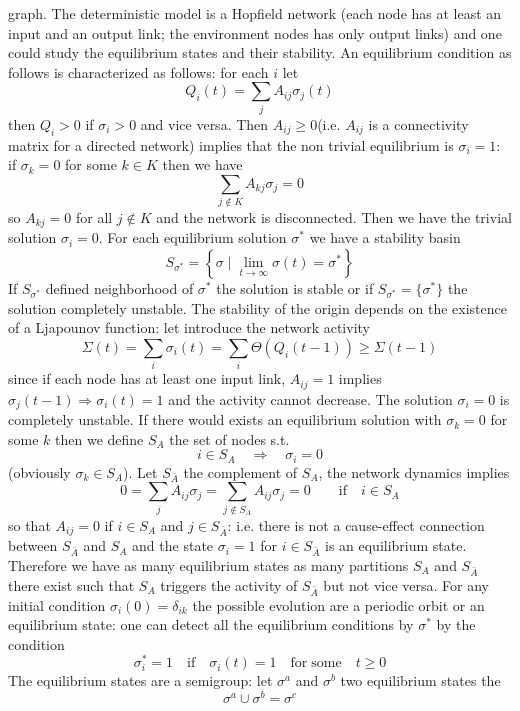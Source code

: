 graph. The deterministic model is a Hopfield network (each node has at least an input and an output link; the environment nodes has only output links)
and one could study the equilibrium states and their stability. An equilibrium condition as follows is characterized as follows:
for each $i$ let
$$
Q_i(t)=\sum_j A_{ij}\sigma_j(t) 
$$
then $Q_i>0$ if $\sigma_i>0$ and vice versa.  Then $A_{ij}\ge 0$(i.e. $A_{ij}$ is a connectivity matrix for a directed network) 
implies that the non trivial equilibrium is $\sigma_i=1$: if $\sigma_k=0$ for some $k\in K$ then we have
$$
\sum_{j\notin K} A_{kj}\sigma_j=0
$$
so $A_{kj}=0$ for all $j\notin K$ and the network is disconnected. Then we have the trivial solution $\sigma_i=0$. For each equilibrium solution $\sigma^\ast$ we have a stability basin
$$
S_{\sigma^\ast}=\left \{\sigma \; | \; \lim_{t\to\infty} \sigma(t)=\sigma^\ast\right \}
$$
If $S_{\sigma^\ast}$ defined neighborhood of $\sigma^\ast$ the solution is stable or if $S_{\sigma^\ast}=\{\sigma^\ast\}$ the solution completely unstable. 
The stability of the origin depends on the existence of a Ljapounov function: let introduce the network activity
$$
\Sigma(t)=\sum_i \sigma_i(t)=\sum_i \Theta(Q_i(t-1))\ge \Sigma(t-1)
$$
since if each node has at least one input link, $A_{ij}=1$ implies $\sigma_j(t-1)\Rightarrow \sigma_i(t)=1$ and the activity cannot decrease. The solution $\sigma_i=0$
is completely unstable. If there would exists an equilibrium solution with $\sigma_k=0$ for some $k$ then we define $S_A$ the set of nodes s.t.
$$
i\in S_A\quad \Rightarrow \quad \sigma_i=0
$$
(obviously $\sigma_k\in S_A$). Let $S_{\bar A}$ the complement of $S_A$, the network dynamics implies
$$
0=\sum_j A_{ij}\sigma_j=\sum_{j\notin S_A} A_{ij}\sigma_j=0 \qquad \textrm{if}\quad i\in S_A
$$
so that $A_{ij}=0$ if $i\in S_A$ and $j\in S_{\bar A}$: i.e. there is not a cause-effect connection between $S_{\bar A}$ and $S_A$ and the state $\sigma_i=1$ for $i\in S_{\bar A}$
is an equilibrium state. Therefore we have as many equilibrium states as many partitions $S_A$ and $S_{\bar A}$ there exist such that $S_A$ triggers the activity of $S_{\bar A}$
but not vice versa. For any initial condition $\sigma_i(0)=\delta_{ik}$ the possible evolution are a periodic orbit or an equilibrium state: one can detect all the equilibrium conditions
by $\sigma^\ast$ by the condition
$$
\sigma_i^\ast=1\quad \textrm{if}\quad \sigma_i(t)=1\quad \textrm{for}\;\textrm{some}\quad t\ge 0
$$
The equilibrium states are a semigroup: let $\sigma^a$ and $\sigma^b$ two equilibrium states the
$$
\sigma^a\cup \sigma^b=\sigma^c
$$
